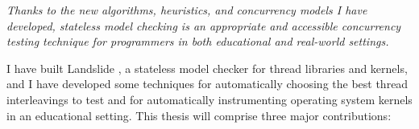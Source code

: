 \vspace{1em}

\begin{center}
	{\em Thanks to the new algorithms, heuristics, and concurrency models I have developed,
	stateless model checking is an appropriate and accessible concurrency testing technique
	for programmers in both educational and real-world settings.}
\end{center}

\vspace{1em}

I have built Landslide \cite{landslide}, a stateless model checker for thread libraries and kernels,
and I have developed some techniques for automatically choosing the best thread interleavings to test
and for automatically instrumenting operating system kernels in an educational setting.
This thesis will comprise three major contributions:

